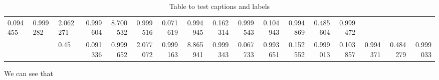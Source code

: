 \begin{table}[h!]
{\begin{adjustwidth}{-3cm}{0cm}
{\begin{tabular}{l|l|l|r|r|r|r|r|r|r|r|r|r|r|r|r|r|}
0.094455 &  0.999282 &  2.062271 &  0.999604 &  8.700532 &  0.999516 &  0.071619 &  0.994945 &  0.162314 &  0.999543 &  0.104943 &  0.994869 &  0.485604 &  0.999472 \\    &   & 0.45 &  0.091336 &  0.999652 &  2.077072 &  0.999163 &  8.865941 &  0.999343 &  0.067733 &  0.993651 &  0.152552 &  0.999013 &  0.103857 &  0.994371 &  0.484279 &  0.999033 
        \\
        \hline
        \end{tabular}
        }
        
        \end{adjustwidth}
        }


    \caption{Table to test captions and labels}
    \label{table1}
\end{table}


We can see that 
